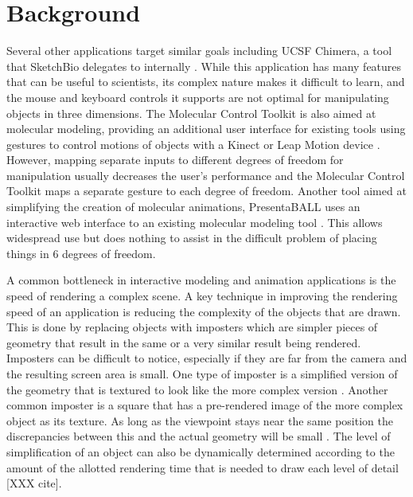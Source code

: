 \documentclass{article} %
\begin{document}
\section{Background}
Several other applications target similar goals including UCSF Chimera, a tool that SketchBio delegates to internally \cite{pettersen2004ucsf}.  While this application has many features that can be useful to scientists, its complex nature makes it difficult to learn, and the mouse and keyboard controls it supports are not optimal for manipulating objects in three dimensions.  The Molecular Control Toolkit is also aimed at molecular modeling, providing an additional user interface for existing tools using gestures to control motions of objects with a Kinect or Leap Motion device \cite{sabirmolecular}.  However, mapping separate inputs to different degrees of freedom for manipulation usually decreases the user's performance\cite{bowman20043d} and the Molecular Control Toolkit maps a separate gesture to each degree of freedom.  Another tool aimed at simplifying the creation of molecular animations, PresentaBALL uses an interactive web interface to an existing molecular modeling tool \cite{nickelspresentaball}.  This allows widespread use but does nothing to assist in the difficult problem of placing things in 6 degrees of freedom.

A common bottleneck in interactive modeling and animation applications is the speed of rendering a complex scene.  A key technique in improving the rendering speed of an application is reducing the complexity of the objects that are drawn.  This is done by replacing objects with imposters which are simpler pieces of geometry that result in the same or a very similar result being rendered.  Imposters can be difficult to notice, especially if they are far from the camera and the resulting screen area is small.  One type of imposter is a simplified version of the geometry that is textured to look like the more complex version \cite{decoret2003billboard}\cite{erikson1998simplification}\cite{cohen1998appearance}.  Another common imposter is a square that has a pre-rendered image of the more complex object as its texture.  As long as the viewpoint stays near the same position the discrepancies between this and the actual geometry will be small \cite{aliaga1996visualization}\cite{maciel1995visual}.  The level of simplification of an object can also be dynamically determined according to the amount of the allotted rendering time that is needed to draw each level of detail [XXX cite].
\end{document}
